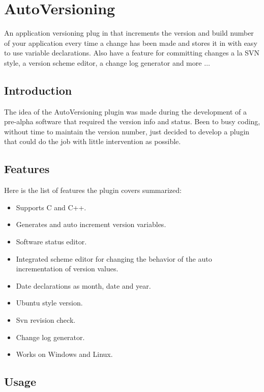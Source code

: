 \section{AutoVersioning}\label{sec:autoversioning}

An application versioning plug in that increments the version and build number of your application every time a change has been made and stores it in  with easy to use variable declarations. Also have a feature for committing changes a la SVN style, a version scheme editor, a change log generator and more $\ldots$

\subsection{Introduction}

The idea of the AutoVersioning plugin was made during the development of a pre-alpha software that required the version info and status. Been to busy coding, without time to maintain the version number, just decided to develop a plugin that could do the job with little intervention as possible.

\subsection{Features}

Here is the list of features the plugin covers summarized:

\begin{itemize}
\item Supports C and C++.
\item Generates and auto increment version variables.
\item Software status editor.
\item Integrated scheme editor for changing the behavior of the auto incrementation of version values.
\item Date declarations as month, date and year.
\item Ubuntu style version.
\item Svn revision check.
\item Change log generator.
\item Works on Windows and Linux.
\end{itemize}

\subsection{Usage}

